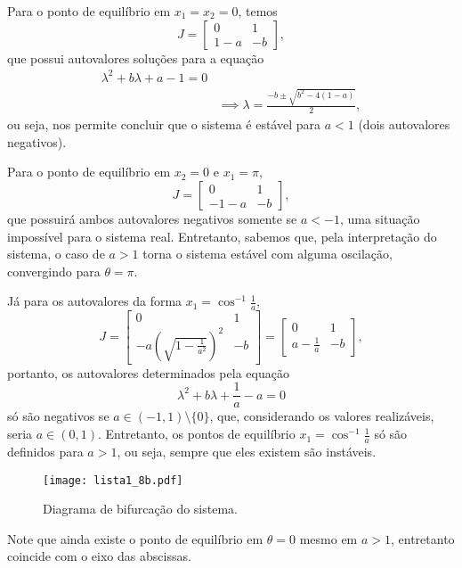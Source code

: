 \documentclass[a4paper]{report}
\begin{document}
Para o ponto de equilíbrio em $x_1=x_2=0$, temos \[
    J = \begin{bmatrix} 0 & 1 \\ 1-a & -b \end{bmatrix} 
,\] que possui autovalores soluções para a equação
\begin{align*}
    \lambda^2 + b\lambda + a-1 = 0 \\
    & \implies \lambda = \frac{-b \pm \sqrt{b^2 -4\left( 1-a \right) } }{2}
,\end{align*}
ou seja, nos permite concluir que o sistema é estável para $a<1$ (dois autovalores negativos).

Para o ponto de equilíbrio em  $x_2=0$ e $x_1=\pi$, \[
    J = \begin{bmatrix} 0 & 1 \\ -1-a & -b \end{bmatrix} 
,\] que possuirá ambos autovalores negativos somente se $a<-1$, uma situação impossível para o sistema real. Entretanto, sabemos que, pela interpretação do sistema, o caso de $a>1$ torna o sistema estável com alguma oscilação, convergindo para  $\theta=\pi$.

Já para os autovalores da forma $x_1=\cos^{-1}\frac{1}{a}$, \[
J = \begin{bmatrix} 
    0 & 1 \\
    -a\left( \sqrt{1-\frac{1}{a^2}}  \right) ^2 & -b
\end{bmatrix}  = \begin{bmatrix} 
    0 & 1 \\
    a - \frac{1}{a} & -b
\end{bmatrix}
,\] portanto, os autovalores determinados pela equação \[
\lambda^2 +b\lambda + \frac{1}{a} -a = 0
\] só são negativos se $a \in (-1,1) \setminus \{0\}$, que, considerando os valores realizáveis, seria $a \in  (0,1)$. Entretanto, os pontos de equilíbrio $x_1=\cos ^{-1} \frac{1}{a}$ só são definidos para $a>1$, ou seja, sempre que eles existem são instáveis.


\begin{figure}[H]
    \centering
    \texttt{[image: lista1\_8b.pdf]}
    \caption{Diagrama de bifurcação do sistema.}
    \label{fig:lista1_8b-pdf}
\end{figure}

Note que ainda existe o ponto de equilíbrio em $\theta=0$ mesmo em $a>1$, entretanto coincide com o eixo das abscissas.
\end{document}

